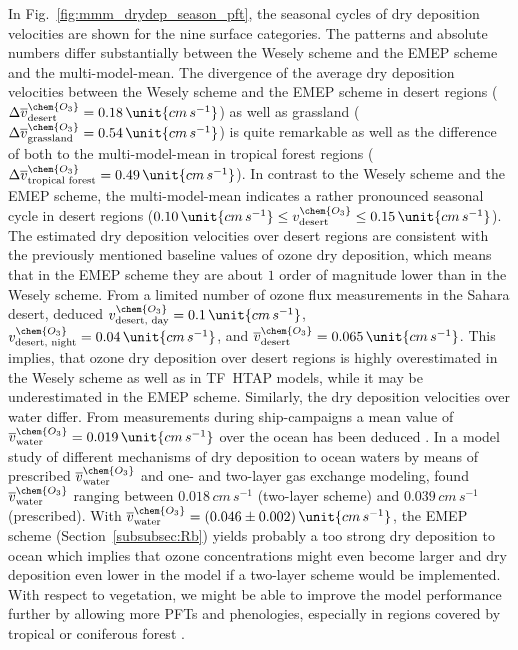 \documentclass[gmd, manuscript]{copernicus}
\begin{document}
In Fig.~\ref{fig:mmm_drydep_season_pft}, the seasonal cycles of dry deposition velocities are shown for the nine surface categories. The patterns and absolute numbers differ substantially between the Wesely scheme and the EMEP scheme and the multi-model-mean. The divergence of the average dry deposition velocities between the Wesely scheme and the EMEP scheme in desert regions ($\Delta \overline{v}_\text{desert}^\chem{O_3} = 0.18\,\unit{cm\,s^{-1}}$) as well as grassland ($\Delta \overline{v}_\text{grassland}^\chem{O_3} = 0.54\,\unit{cm\,s^{-1}}$) is quite remarkable as well as the difference of both to the multi-model-mean in tropical forest regions ($\Delta \overline{v}_\text{tropical forest}^\chem{O_3} = 0.49\,\unit{cm\,s^{-1}}$). In contrast to the Wesely scheme and the EMEP scheme, the multi-model-mean indicates a rather pronounced seasonal cycle in desert regions ($0.10\,\unit{cm\,s^{-1}} \leq v^\chem{O_3}_\text{desert}\leq 0.15\,\unit{cm\,s^{-1}}$). The estimated dry deposition velocities over desert regions are consistent with the previously mentioned baseline values of ozone dry deposition, which means that in the EMEP scheme they are about $1$ order of magnitude lower than in the Wesely scheme. From a limited number of ozone flux measurements in the Sahara desert, \citet{AE:Gusten1995} deduced $v^\chem{O_3}_\text{desert, day} = 0.1\,\unit{cm\,s^{-1}}$, $v^\chem{O_3}_\text{desert, night} = 0.04\,\unit{cm\,s^{-1}}$, and $\overline{v}^\chem{O_3}_\text{desert} = 0.065\,\unit{cm\,s^{-1}}$. This implies, that ozone dry deposition over desert regions is highly overestimated in the Wesely scheme as well as in TF~HTAP models, while it may be underestimated in the EMEP scheme. Similarly, the dry deposition velocities over water differ. From measurements during ship-campaigns a mean value of $\overline{v}^\chem{O_3}_\text{water} = 0.019\,\unit{cm\,s^{-1}}$ over the ocean has been deduced \citep{JGR:Helmig2012}. In a model study of different mechanisms of dry deposition to ocean waters by means of prescribed $\overline{v}_\text{water}^\chem{O_3}$ and one- and two-layer gas exchange modeling, \citet{ACP:Luhar2017} found $\overline{v}_\text{water}^\chem{O_3}$ ranging between $0.018\,\unit{cm\,s^{-1}}$ (two-layer scheme) and $0.039\,\unit{cm\,s^{-1}}$ (prescribed). With $\overline{v}^\chem{O_3}_\text{water} = (0.046\pm0.002)\,\unit{cm\,s^{-1}}$, the EMEP scheme (Section~\ref{subsubsec:Rb}) yields probably a too strong dry deposition to ocean which implies that ozone concentrations might even become larger and dry deposition even lower in the model if a two-layer scheme would be implemented. With respect to vegetation, we might be able to improve the model performance further by allowing more PFTs and phenologies, especially in regions covered by tropical or coniferous forest \citep{GCB:Anav2017}. 
\end{document}
